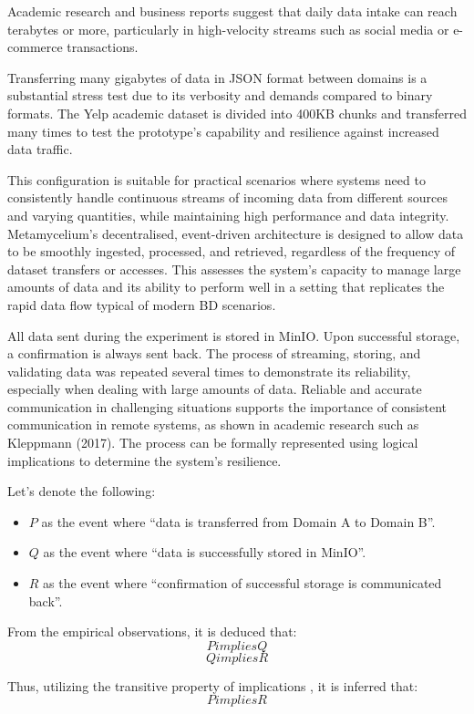\documentclass[journal]{IEEEtran}
\begin{document}
Academic research and business reports suggest that daily data intake can reach terabytes or more, particularly in high-velocity streams such as social media or e-commerce transactions. 

Transferring many gigabytes of data in JSON format between domains is a substantial stress test due to its verbosity and demands compared to binary formats. The Yelp academic dataset is divided into 400KB chunks and transferred many times to test the prototype's capability and resilience against increased data traffic. 

This configuration is suitable for practical scenarios where systems need to consistently handle continuous streams of incoming data from different sources and varying quantities, while maintaining high performance and data integrity. Metamycelium's decentralised, event-driven architecture is designed to allow data to be smoothly ingested, processed, and retrieved, regardless of the frequency of dataset transfers or accesses. This assesses the system's capacity to manage large amounts of data and its ability to perform well in a setting that replicates the rapid data flow typical of modern BD scenarios.


All data sent during the experiment is stored in MinIO. Upon successful storage, a confirmation is always sent back. The process of streaming, storing, and validating data was repeated several times to demonstrate its reliability, especially when dealing with large amounts of data. Reliable and accurate communication in challenging situations supports the importance of consistent communication in remote systems, as shown in academic research such as Kleppmann (2017). The process can be formally represented using logical implications to determine the system's resilience.

Let's denote the following:
\begin{itemize}
    \item \( P \) as the event where ``data is transferred from Domain A to Domain B''.
    \item \( Q \) as the event where ``data is successfully stored in MinIO''.
    \item \( R \) as the event where ``confirmation of successful storage is communicated back''.
\end{itemize}

From the empirical observations, it is deduced that:
\[ P  implies  Q \]
\[ Q  implies  R \]

Thus, utilizing the transitive property of implications \cite{johnson2019logic}, it is inferred that:
\[ P  implies  R \]
\end{document}
